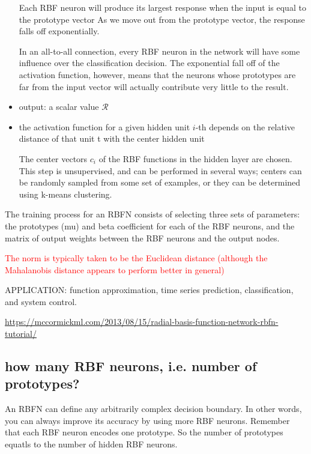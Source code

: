 \begin{itemize}
\begin{mdframed}
Each RBF neuron will produce its largest response when the input is equal to the prototype vector
As we move out from the prototype vector, the response falls off exponentially.

In an all-to-all connection, every RBF neuron in the network will have some
influence over the classification decision.
The exponential fall off of the activation function, however, means that the
neurons whose prototypes are far from the input vector will actually contribute
very little to the result.

\end{mdframed} 
  
  \item output: a scalar value $\mathcal{R}$
  
  
  \item the activation function for a given hidden unit $i$-th depends on the
  relative distance of that unit t with the center hidden unit
  
  The center vectors $c_i$ of the RBF functions in the hidden layer are chosen.
  This step is unsupervised, and can be performed in several ways; centers can
  be randomly sampled from some set of examples, or they can be determined using
  k-means clustering.
  
  
\end{itemize}


The training process for an RBFN consists of selecting three sets of parameters:
the prototypes (mu) and beta coefficient for each of the RBF neurons, and the
matrix of output weights between the RBF neurons and the output nodes.

\textcolor{red}{The norm is typically taken to be the Euclidean distance (although the
Mahalanobis distance appears to perform better in general)}


APPLICATION:  function approximation, time series prediction, classification, and system control. 

\url{https://mccormickml.com/2013/08/15/radial-basis-function-network-rbfn-tutorial/}

\subsection{how many RBF neurons, i.e. number of prototypes?}

An RBFN can define any arbitrarily complex decision boundary. In other words,
you can always improve its accuracy by using more RBF neurons.
Remember that each RBF neuron encodes one prototype. So the number of prototypes
equatls to the number of hidden RBF neurons.

